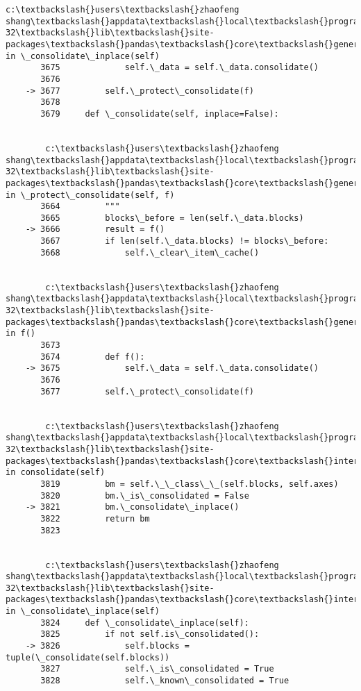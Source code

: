\documentclass[11pt]{article}
\begin{document}
\begin{Verbatim}[commandchars=\\\{\}]
        c:\textbackslash{}users\textbackslash{}zhaofeng shang\textbackslash{}appdata\textbackslash{}local\textbackslash{}programs\textbackslash{}python\textbackslash{}python36-32\textbackslash{}lib\textbackslash{}site-packages\textbackslash{}pandas\textbackslash{}core\textbackslash{}generic.py in \_consolidate\_inplace(self)
       3675             self.\_data = self.\_data.consolidate()
       3676 
    -> 3677         self.\_protect\_consolidate(f)
       3678 
       3679     def \_consolidate(self, inplace=False):
    

        c:\textbackslash{}users\textbackslash{}zhaofeng shang\textbackslash{}appdata\textbackslash{}local\textbackslash{}programs\textbackslash{}python\textbackslash{}python36-32\textbackslash{}lib\textbackslash{}site-packages\textbackslash{}pandas\textbackslash{}core\textbackslash{}generic.py in \_protect\_consolidate(self, f)
       3664         """
       3665         blocks\_before = len(self.\_data.blocks)
    -> 3666         result = f()
       3667         if len(self.\_data.blocks) != blocks\_before:
       3668             self.\_clear\_item\_cache()
    

        c:\textbackslash{}users\textbackslash{}zhaofeng shang\textbackslash{}appdata\textbackslash{}local\textbackslash{}programs\textbackslash{}python\textbackslash{}python36-32\textbackslash{}lib\textbackslash{}site-packages\textbackslash{}pandas\textbackslash{}core\textbackslash{}generic.py in f()
       3673 
       3674         def f():
    -> 3675             self.\_data = self.\_data.consolidate()
       3676 
       3677         self.\_protect\_consolidate(f)
    

        c:\textbackslash{}users\textbackslash{}zhaofeng shang\textbackslash{}appdata\textbackslash{}local\textbackslash{}programs\textbackslash{}python\textbackslash{}python36-32\textbackslash{}lib\textbackslash{}site-packages\textbackslash{}pandas\textbackslash{}core\textbackslash{}internals.py in consolidate(self)
       3819         bm = self.\_\_class\_\_(self.blocks, self.axes)
       3820         bm.\_is\_consolidated = False
    -> 3821         bm.\_consolidate\_inplace()
       3822         return bm
       3823 
    

        c:\textbackslash{}users\textbackslash{}zhaofeng shang\textbackslash{}appdata\textbackslash{}local\textbackslash{}programs\textbackslash{}python\textbackslash{}python36-32\textbackslash{}lib\textbackslash{}site-packages\textbackslash{}pandas\textbackslash{}core\textbackslash{}internals.py in \_consolidate\_inplace(self)
       3824     def \_consolidate\_inplace(self):
       3825         if not self.is\_consolidated():
    -> 3826             self.blocks = tuple(\_consolidate(self.blocks))
       3827             self.\_is\_consolidated = True
       3828             self.\_known\_consolidated = True
    


\end{Verbatim}
\end{document}
